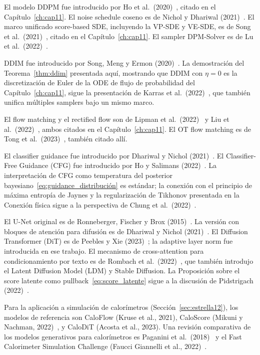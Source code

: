 \begin{notasbib}
El modelo DDPM fue introducido por Ho et al.\ (2020)~\cite{ho2020denoising},
citado en el Capítulo~\ref{ch:cap11}. El noise schedule coseno es de Nichol y
Dhariwal (2021)~\cite{nichol2021improved}. El marco unificado score-based SDE,
incluyendo la VP-SDE y VE-SDE, es de Song et al.\ (2021)~\cite{song2021score},
citado en el Capítulo~\ref{ch:cap11}. El sampler DPM-Solver es de Lu et al.\
(2022)~\cite{lu2022dpm}.

DDIM fue introducido por Song, Meng y Ermon (2020)~\cite{song2020denoising}. La
demostración del Teorema~\ref{thm:ddim} presentada aquí, mostrando que DDIM con
$\eta=0$ es la discretización de Euler de la ODE de flujo de probabilidad del
Capítulo~\ref{ch:cap11}, sigue la presentación de Karras et al.\
(2022)~\cite{karras2022elucidating}, que también unifica múltiples samplers bajo
un mismo marco.

El flow matching y el rectified flow son de Lipman et al.\
(2022)~\cite{lipman2022flow} y Liu et al.\ (2022)~\cite{liu2022flow},
ambos citados en el Capítulo~\ref{ch:cap11}. El OT flow matching es de Tong et
al.\ (2023)~\cite{tong2023improving}, también citado allí.

El classifier guidance fue introducido por Dhariwal y Nichol
(2021)~\cite{dhariwal2021diffusion}. El Classifier-Free Guidance (CFG) fue
introducido por Ho y Salimans (2022)~\cite{ho2022classifier}. La interpretación
de CFG como temperatura del posterior bayesiano~\eqref{eq:guidance_distribución}
es estándar; la conexión con el principio de máxima entropía de Jaynes y la
regularización de Tikhonov presentada en la \textsf{Conexión física} sigue a
la perspectiva de Chung et al.\ (2022)~\cite{chung2022diffusion}.

El U-Net original es de Ronneberger, Fischer y Brox (2015)~\cite{ronneberger2015unet}.
La versión con bloques de atención para difusión es de Dhariwal y Nichol
(2021)~\cite{dhariwal2021diffusion}. El Diffusion Transformer (DiT) es de
Peebles y Xie (2023)~\cite{peebles2023scalable}; la adaptive layer norm fue
introducida en ese trabajo. El mecanismo de cross-attention para condicionamiento
por texto es de Rombach et al.\ (2022)~\cite{rombach2022high}, que también
introdujo el Latent Diffusion Model (LDM) y Stable Diffusion. La Proposición
sobre el score latente como pullback~\eqref{eq:score_latente} sigue a la
discusión de Pidstrigach (2022)~\cite{pidstrigach2022score}.

Para la aplicación a simulación de calorímetros (Sección~\ref{sec:estrella12}),
los modelos de referencia son CaloFlow (Kruse et al., 2021), CaloScore (Mikuni
y Nachman, 2022)~\cite{mikuni2022score}, y CaloDiT (Acosta et al., 2023). Una
revisión comparativa de los modelos generativos para calorímetros es Paganini et
al.\ (2018)~\cite{paganini2018calogan} y el Fast Calorimeter Simulation Challenge
(Faucci Giannelli et al., 2022)~\cite{faucci2022fast}.
\end{notasbib}

